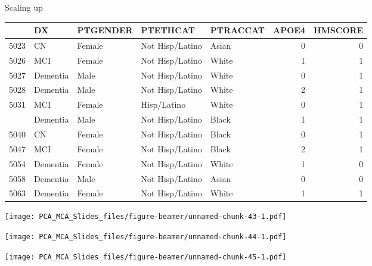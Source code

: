 \documentclass[
  ignorenonframetext,
]{beamer}
\begin{document}
\begin{frame}{Scaling up}
\protect\hypertarget{scaling-up-2}{}

\begin{table}[H]
\centering\begingroup\fontsize{7}{9}\selectfont

\begin{tabular}{lllllrr}
\toprule
  & DX & PTGENDER & PTETHCAT & PTRACCAT & APOE4 & HMSCORE\\
\midrule
5023 & CN & Female & Not Hisp/Latino & Asian & 0 & 0\\
5026 & MCI & Female & Not Hisp/Latino & White & 1 & 1\\
5027 & Dementia & Male & Not Hisp/Latino & White & 0 & 1\\
5028 & Dementia & Male & Not Hisp/Latino & White & 2 & 1\\
5031 & MCI & Female & Hisp/Latino & White & 0 & 1\\
\addlinespace
5037 & Dementia & Male & Not Hisp/Latino & Black & 1 & 1\\
5040 & CN & Female & Not Hisp/Latino & Black & 0 & 1\\
5047 & MCI & Female & Not Hisp/Latino & Black & 2 & 1\\
5054 & Dementia & Female & Not Hisp/Latino & White & 1 & 0\\
5058 & Dementia & Male & Not Hisp/Latino & Asian & 0 & 0\\
5063 & Dementia & Female & Not Hisp/Latino & White & 1 & 1\\
\bottomrule
\end{tabular}\endgroup{}
\end{table}

\end{frame}

\begin{frame}

\texttt{[image: PCA\_MCA\_Slides\_files/figure-beamer/unnamed-chunk-43-1.pdf]}

\end{frame}

\begin{frame}

\texttt{[image: PCA\_MCA\_Slides\_files/figure-beamer/unnamed-chunk-44-1.pdf]}

\end{frame}

\begin{frame}

\texttt{[image: PCA\_MCA\_Slides\_files/figure-beamer/unnamed-chunk-45-1.pdf]}

\end{frame}
\end{document}
